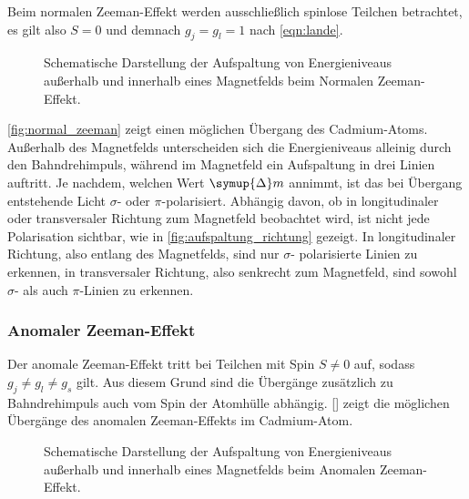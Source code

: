     Beim normalen Zeeman-Effekt werden ausschließlich spinlose Teilchen betrachtet,
    es gilt also $S = 0$ und demnach $g_j = g_l = 1$ nach \autoref{eqn:lande}.
    \begin{figure}
      \centering
        \resizebox{0.5\textwidth}{!}{
            
        }
       \caption{Schematische Darstellung der Aufspaltung von Energieniveaus außerhalb und innerhalb eines Magnetfelds beim Normalen Zeeman-Effekt. \cite{haken_wolf}}
       \label{fig:normal_zeeman}
    \end{figure}
    \autoref{fig:normal_zeeman} zeigt einen möglichen Übergang des Cadmium-Atoms.
    Außerhalb des Magnetfelds unterscheiden sich die Energieniveaus alleinig durch den Bahndrehimpuls,
    während im Magnetfeld ein Aufspaltung in drei Linien auftritt.
    Je nachdem,
    welchen Wert $\symup{\Delta} m$ annimmt,
    ist das bei Übergang entstehende Licht $\sigma$- oder $\pi$-polarisiert.
    Abhängig davon,
    ob in longitudinaler oder transversaler Richtung zum Magnetfeld beobachtet wird,
    ist nicht jede Polarisation sichtbar,
    wie in \autoref{fig:aufspaltung_richtung} gezeigt.
    In longitudinaler Richtung,
    also entlang des Magnetfelds,
    sind nur $\sigma$- polarisierte Linien zu erkennen,
    in transversaler Richtung,
    also senkrecht zum Magnetfeld,
    sind sowohl $\sigma$- als auch $\pi$-Linien zu erkennen.


\subsubsection{Anomaler Zeeman-Effekt}

    Der anomale Zeeman-Effekt tritt bei Teilchen mit Spin $S \neq 0$ auf,
    sodass $g_j \neq g_l \neq g_s$ gilt.
    Aus diesem Grund sind die Übergänge zusätzlich zu Bahndrehimpuls auch vom Spin der Atomhülle abhängig.
    \autoref{} zeigt die möglichen Übergänge des anomalen Zeeman-Effekts im Cadmium-Atom.
    \begin{figure}
      \centering
        \resizebox{0.5\textwidth}{!}{
            
        }
       \caption{Schematische Darstellung der Aufspaltung von Energieniveaus außerhalb und innerhalb eines Magnetfelds beim Anomalen Zeeman-Effekt.}
       \label{fig:anomal_zeeman}
    \end{figure}


